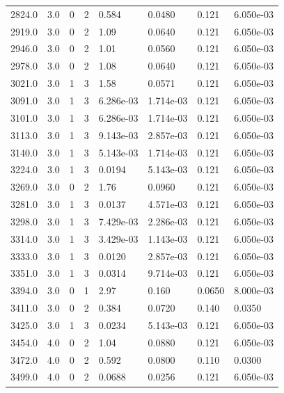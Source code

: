 \documentclass[preview]{standalone}
\begin{document}
{{{\begin{tabular}{L{1.2cm}C{1.2cm} C{0.3cm}C{0.5cm} C{1.4cm}C{1.4cm} C{1.4cm}C{1.4cm}}
  2824.0  &   3.0  & 0     &  2 &  0.584  & 0.0480  & 0.121 &  6.050e-03   \\ 
  2919.0  &   3.0  & 0     &  2 &  1.09  & 0.0640  & 0.121 &  6.050e-03   \\ 
  2946.0  &   3.0  & 0     &  2 &  1.01  & 0.0560  & 0.121 &  6.050e-03   \\ 
  2978.0  &   3.0  & 0     &  2 &  1.08  & 0.0640  & 0.121 &  6.050e-03   \\ 
  3021.0  &   3.0  & 1     &  3 &  1.58  & 0.0571  & 0.121 &  6.050e-03   \\ 
  3091.0  &   3.0  & 1     &  3 &  6.286e-03  & 1.714e-03  & 0.121 &  6.050e-03   \\ 
  3101.0  &   3.0  & 1     &  3 &  6.286e-03  & 1.714e-03  & 0.121 &  6.050e-03   \\ 
  3113.0  &   3.0  & 1     &  3 &  9.143e-03  & 2.857e-03  & 0.121 &  6.050e-03   \\ 
  3140.0  &   3.0  & 1     &  3 &  5.143e-03  & 1.714e-03  & 0.121 &  6.050e-03   \\ 
  3224.0  &   3.0  & 1     &  3 &  0.0194  & 5.143e-03  & 0.121 &  6.050e-03   \\ 
  3269.0  &   3.0  & 0     &  2 &  1.76  & 0.0960  & 0.121 &  6.050e-03   \\ 
  3281.0  &   3.0  & 1     &  3 &  0.0137  & 4.571e-03  & 0.121 &  6.050e-03   \\ 
  3298.0  &   3.0  & 1     &  3 &  7.429e-03  & 2.286e-03  & 0.121 &  6.050e-03   \\ 
  3314.0  &   3.0  & 1     &  3 &  3.429e-03  & 1.143e-03  & 0.121 &  6.050e-03   \\ 
  3333.0  &   3.0  & 1     &  3 &  0.0120  & 2.857e-03  & 0.121 &  6.050e-03   \\ 
  3351.0  &   3.0  & 1     &  3 &  0.0314  & 9.714e-03  & 0.121 &  6.050e-03   \\ 
  3394.0  &   3.0  & 0     &  1 &  2.97  & 0.160  & 0.0650 &  8.000e-03   \\ 
  3411.0  &   3.0  & 0     &  2 &  0.384  & 0.0720  & 0.140 &  0.0350   \\ 
  3425.0  &   3.0  & 1     &  3 &  0.0234  & 5.143e-03  & 0.121 &  6.050e-03   \\ 
  3454.0  &   4.0  & 0     &  2 &  1.04  & 0.0880  & 0.121 &  6.050e-03   \\ 
  3472.0  &   4.0  & 0     &  2 &  0.592  & 0.0800  & 0.110 &  0.0300   \\ 
  3499.0  &   4.0  & 0     &  2 &  0.0688  & 0.0256  & 0.121 &  6.050e-03   \\ 

\end{tabular}}}}
\end{document}

